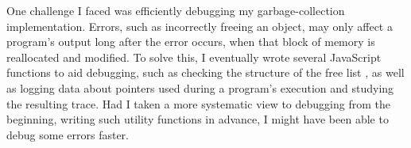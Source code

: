 



%



One challenge I faced was efficiently debugging my garbage-collection implementation.
Errors, such as incorrectly freeing an object, may only affect a program's output long after the error occurs, when that block of memory is reallocated and modified. To solve this, I eventually wrote several JavaScript functions to aid debugging, such as checking the structure of the free list%
, as well as logging data about pointers used during a program's execution and studying the resulting trace. 
Had I taken a more systematic view to debugging from the beginning, writing such utility functions in advance, I might have been able to debug some errors faster.

